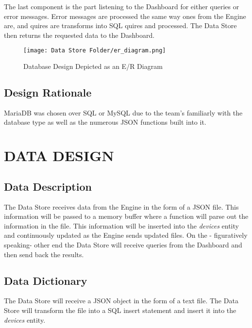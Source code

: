 \documentclass[letterpaper,12pt,oneside,listof=totoc]{scrreprt}
\begin{document}
The last component is the part listening to the Dashboard for either queries or error messages. Error messages are processed the same way ones from the Engine are, and quires are transforms into SQL quires and processed. The Data Store then returns the requested data to the Dashboard.

\begin{figure}[h!]
\centering
\texttt{[image: Data Store Folder/er\_diagram.png]}
\caption{Database Design Depicted as an E/R Diagram}
\label{erdiagram}
\end{figure}

\section{Design Rationale}
MariaDB was chosen over SQL or MySQL due to the team's familiarly with the database type as well as the numerous JSON functions built into it.

\chapter{DATA DESIGN}

\section{Data Description}
The Data Store receives data from the Engine in the form of a JSON file. This information will be passed to a memory buffer where a function will parse out the information in the file. This information will be inserted into the \textit{devices} entity and continuously updated as the Engine sends updated files. On the - figuratively speaking- other end the Data Store will receive queries from the Dashboard and then send back the results.

\section{Data Dictionary}
The Data Store will receive a JSON object in the form of a text file. The Data Store will transform the file into a SQL insert statement and insert it into the \textit{devices} entity. 
\end{document}
